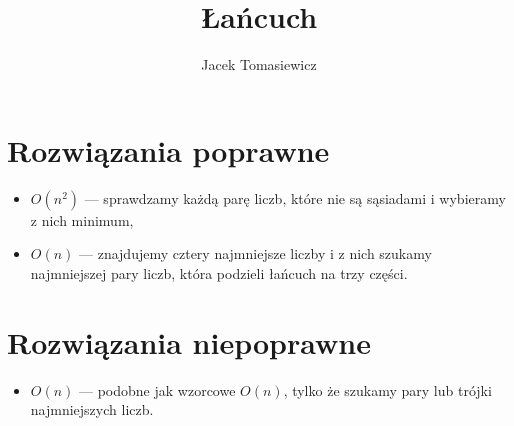 \documentclass[opr,utf8]{sinol}
\title{Łańcuch}
\author{Jacek Tomasiewicz}
\begin{document}
  \begin{tasktext}%
    \section{Rozwiązania poprawne}
      
	\begin{itemize}
	\item
	$O(n^2)$ --- sprawdzamy każdą parę liczb, które nie są sąsiadami i wybieramy z nich minimum,

	\item
	$O(n)$ --- znajdujemy cztery najmniejsze liczby i z nich szukamy najmniejszej pary liczb, która podzieli łańcuch na trzy części.

	\end{itemize}

    \section{Rozwiązania niepoprawne}
	\begin{itemize}
	\item
	$O(n)$ --- podobne jak wzorcowe $O(n)$, tylko że szukamy pary lub trójki najmniejszych liczb.
	\end{itemize}

  \end{tasktext}
\end{document}
